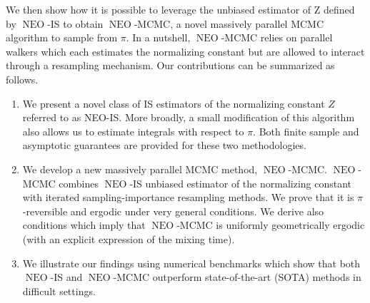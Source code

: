 \documentclass{article}
\def\IFIS{\ensuremath{\operatorname{NEO}}}
\newcommand{\1}{\mathds{1}}
\def\target{\pi}
\def\const{Z}
\begin{document}
We then show how it is possible to leverage the unbiased estimator of $\mathrm{Z}$ defined by \IFIS-IS to obtain \IFIS-MCMC, a novel massively parallel MCMC algorithm to sample from $\pi$. In a nutshell, \IFIS-MCMC relies on parallel walkers which each estimates the normalizing constant but are allowed to interact through a resampling mechanism.  Our contributions can be summarized as follows.
\begin{enumerate}[label=\textbf{(\roman*)}]
    \item We present a novel class of IS estimators of the normalizing constant $\const$ referred to as  NEO-IS. More broadly, a small modification of this algorithm also allows us to estimate integrals with respect to $\target$. 
    Both finite sample and asymptotic guarantees are provided for these two  methodologies.
    \item We develop a new massively parallel MCMC method, \IFIS-MCMC. \IFIS-MCMC combines \IFIS-IS unbiased estimator of the normalizing constant with iterated sampling-importance resampling methods. We prove that it is $\target$-reversible and ergodic under very general conditions. We derive also conditions which imply that \IFIS-MCMC is  uniformly geometrically ergodic (with an explicit expression of the mixing time).
    \item We illustrate our findings using numerical benchmarks which show that both \IFIS-IS and \IFIS-MCMC outperform  state-of-the-art (SOTA) methods in difficult settings. 
\end{enumerate}
\end{document}
